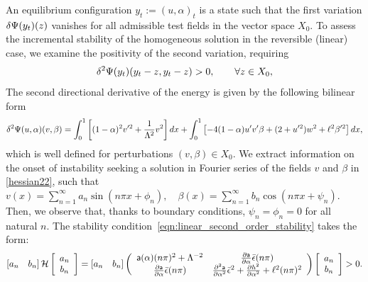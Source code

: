 An equilibrium configuration $y_t:=(u,\alpha)_t$ is a state such that the first variation $\delta \Psi(y_t)(z)$ vanishes for all admissible test fields in the vector space $X_0$. 
To assess the incremental stability of the homogeneous solution in the reversible (linear) case, we examine the positivity of the second variation, requiring
\begin{equation}
\delta^2 \Psi(y_t)(y_t-z, y_t-z)>0, \qquad  \forall z\in X_0,
\label{eqn:linear_second_order_stability}
\end{equation} 
{The second directional derivative of the energy is given by the following bilinear form}
\begin{equation}
\delta^2 \Psi(u,\alpha)(v,\beta)=\int_0^1 \left[(1-\alpha)^2v'^2 
+\frac{1}{\Lambda^2} v^2 \right]dx
+\int_0^1
\left[ - 4(1-\alpha)u' v'\beta+(2+ u'^2)w^2+\ell^2\beta'^2 \right] dx, 
\label{hessian22}
\end{equation}
which is well defined for perturbations $(v, \beta)\in X_0$.
{We} extract information on the onset of instability  seeking a solution in Fourier series of the fields $v$ and $\beta$ in \eqref{hessian22}, such that $v(x)=\sum_{n=1}^{\infty} a_{n} \sin \left(n \pi x+\phi_{n}\right), \quad \beta(x)=\sum_{n=1}^{\infty} b_{n} \cos \left(n \pi x+\psi_{n}\right)$. Then, we observe that, thanks to boundary conditions, $\psi_{n}=\phi_{n}=0$ for all natural $n$. The stability condition~\eqref{eqn:linear_second_order_stability}  takes the form:
\begin{align}\left[ a_n \quad b_n \right] \mathcal{H} \left[ \begin{array}{c} a_n \\ b_n \end{array} \right]=\left[ a_n \quad b_n \right]\left(
\begin{array}{cc}
\mathsf{a}(\alpha)(n\pi)^2+\Lambda^{-2}  & \frac{\partial \mathsf{a}}{\partial \alpha}\bar\epsilon(n\pi)  \\
\frac{\partial \mathsf{a}}{\partial \alpha}\bar\epsilon(n\pi)  &   \frac{\partial^2 \mathsf{a}}{\partial \alpha^2}\bar\epsilon^2+ \frac{\partial h^2}{\partial \alpha^2}+\ell^2(n\pi)^2  \\
\end{array}
\right)\left[ \begin{array}{c} a_n \\ b_n \end{array} \right]>0.\label{hessian1}\end{align}
